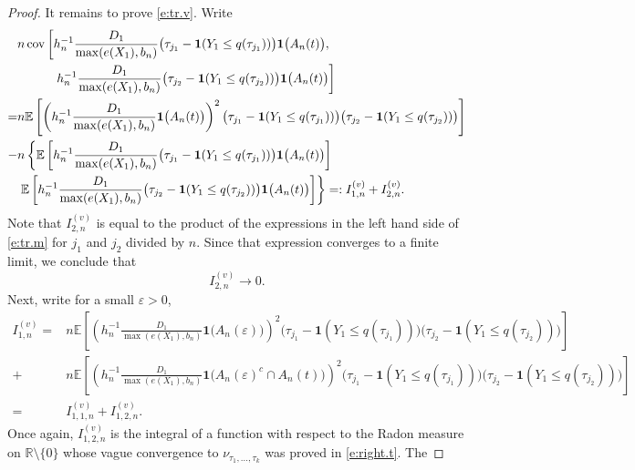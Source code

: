 \documentclass[12pt]{amsart}
\newcommand{\vep}{\varepsilon}
\newcommand{\bbr}{\mathbb{R}}
\newcommand{\cov}{\mathrm{cov}}
\newcommand{\1}{\mathbbm{1}}
\newcommand{\0}{\mathbf{0}}
\newcommand{\one}{\mathbf{1}}
\newcommand{\E}{\mathbb{E}}
\theoremstyle{plain}
\theoremstyle{definition}
\begin{document}
\begin{proof}
It remains to prove \eqref{e:tr.v}. Write
\begin{align*}
& n\, \cov\left[ h_n^{-1}\frac{D_1}{\max(e(X_1),b_n)}
  \bigl( \tau_{j_1}-\one(Y_1\leq q(\tau_{j_1}))\bigr)  \one\bigl(
                               A_n(t)\bigr), \right. \\
\notag &\left. \hskip 0.4in h_n^{-1}\frac{D_1}{\max(e(X_1),b_n)}
  \bigl( \tau_{j_2}-\one(Y_1\leq q(\tau_{j_2}))\bigr)  \one\bigl(
                               A_n(t)\bigr)\right] \\
=&n\E\left[  \left(h_n^{-1}\frac{D_1}{\max(e(X_1),b_n)}\one\bigl(
                               A_n(t)\bigr)\right)^2 
  \bigl( \tau_{j_1}-\one(Y_1\leq q(\tau_{j_1}))\bigr)  \bigl(
   \tau_{j_2}-\one(Y_1\leq q(\tau_{j_2}))\bigr)  \right] \\
-&n\left\{\E\left[  h_n^{-1}\frac{D_1}{\max(e(X_1),b_n)}
  \bigl( \tau_{j_1}-\one(Y_1\leq q(\tau_{j_1}))\bigr)  \one\bigl(
                               A_n(t)\bigr)\right] \right. \\
& \left.\E\left[  h_n^{-1}\frac{D_1}{\max(e(X_1),b_n)}
  \bigl( \tau_{j_2}-\one(Y_1\leq q(\tau_{j_2}))\bigr)  \one\bigl(
                               A_n(t)\bigr)\right] \right\} =: I_{1,n}^{(v)} + I_{2,n}^{(v)}. 
\end{align*}
Note that  $I_{2,n}^{(v)}$ is equal to the product of the expressions in
the left hand side of \eqref{e:tr.m} for $j_1$ and $j_2$ 
divided by $n$. Since that
expression converges to a finite limit, we conclude that
\begin{equation} \label{e:var.2n}
  I_{2,n}^{(v)} \to  0.
\end{equation}
Next, write for a small $\vep>0$, 
\begin{align*}
  I_{1,n}^{(v)} =& n\E\left[  \left(h_n^{-1}\frac{D_1}{\max(e(X_1),b_n)}\one\bigl(
                               A_n(\vep)\bigr)\right)^2 
  \bigl( \tau_{j_1}-\one(Y_1\leq q(\tau_{j_1}))\bigr)  \bigl(
  \tau_{j_2}-\one(Y_1\leq q(\tau_{j_2}))\bigr)  \right] \\
+& 
 n\E\left[
   \left(h_n^{-1}\frac{D_1}{\max(e(X_1),b_n)}\one\bigl(A_n(\vep)^c\cap 
                               A_n(t)\bigr)\right)^2 
  \bigl( \tau_{j_1}-\one(Y_1\leq q(\tau_{j_1}))\bigr)  \bigl(
   \tau_{j_2}-\one(Y_1\leq q(\tau_{j_2}))\bigr)  \right] \\
=& I_{1,1,n}^{(v)} +I_{1,2,n}^{(v)}. 
\end{align*}
Once again, $ I_{1,2,n}^{(v)}$ is the integral of a function with
respect to the Radon measure on $\bbr\setminus \{0\}$ whose vague
convergence to $\nu_{\tau_1,\ldots,\tau_k}$ was proved in \eqref{e:right.t}. The

\end{proof}
\end{document}

